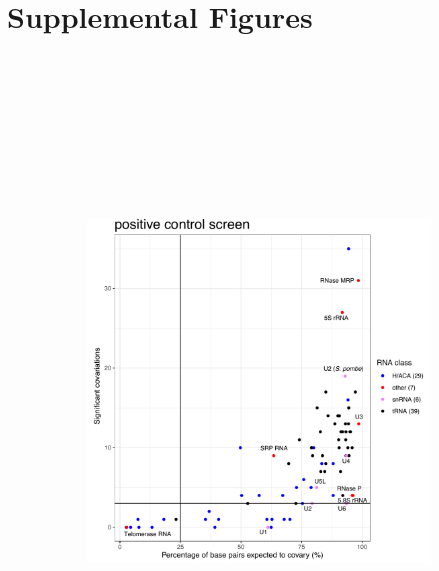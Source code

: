\documentclass[12pt]{report}
\begin{document}
\section{Supplemental Figures}
\begin{figure}[!htb]
	\begin{subfigure}{1\textwidth}
		\center
		\includegraphics[width=7in, height=7in,keepaspectratio]{figures/figure_S1.pdf}	
	\end{subfigure}
	

\end{figure}
\end{document}
